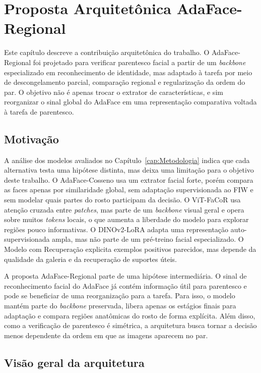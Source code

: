\chapter[AdaFace-Regional]{Proposta Arquitetônica AdaFace-Regional}
\label{cap:adaface-regional}

Este capítulo descreve a contribuição arquitetônica do trabalho. O AdaFace-Regional foi projetado para verificar parentesco facial a partir de um \textit{backbone} especializado em reconhecimento de identidade, mas adaptado à tarefa por meio de descongelamento parcial, comparação regional e regularização da ordem do par. O objetivo não é apenas trocar o extrator de características, e sim reorganizar o sinal global do AdaFace em uma representação comparativa voltada à tarefa de parentesco.

\section{Motivação}

A análise dos modelos avaliados no Capítulo~\ref{cap:Metodologia} indica que cada alternativa testa uma hipótese distinta, mas deixa uma limitação para o objetivo deste trabalho. O AdaFace-Cosseno usa um extrator facial forte, porém compara as faces apenas por similaridade global, sem adaptação supervisionada ao FIW e sem modelar quais partes do rosto participam da decisão. O ViT-FaCoR usa atenção cruzada entre \textit{patches}, mas parte de um \textit{backbone} visual geral e opera sobre muitos \textit{tokens} locais, o que aumenta a liberdade do modelo para explorar regiões pouco informativas. O DINOv2-LoRA adapta uma representação auto-supervisionada ampla, mas não parte de um pré-treino facial especializado. O Modelo com Recuperação explicita exemplos positivos parecidos, mas depende da qualidade da galeria e da recuperação de suportes úteis.

A proposta AdaFace-Regional parte de uma hipótese intermediária. O sinal de reconhecimento facial do AdaFace já contém informação útil para parentesco e pode se beneficiar de uma reorganização para a tarefa. Para isso, o modelo mantém parte do \textit{backbone} preservada, libera apenas os estágios finais para adaptação e compara regiões anatômicas do rosto de forma explícita. Além disso, como a verificação de parentesco é simétrica, a arquitetura busca tornar a decisão menos dependente da ordem em que as imagens aparecem no par.

\section{Visão geral da arquitetura}

